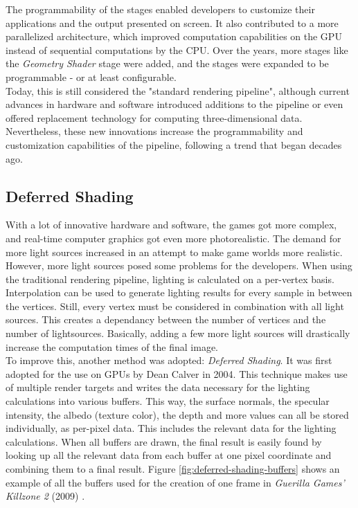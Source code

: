 \noindent
The programmability of the stages enabled developers to customize their applications and the output presented 
on screen. It also contributed to a more parallelized architecture, which improved computation capabilities on 
the \ac{GPU} instead of sequential computations by the \ac{CPU}. Over the years, more stages like the 
\emph{Geometry Shader} stage were added, and the stages were expanded to be programmable - or at least configurable. \\

\noindent
Today, this is still considered the "standard rendering pipeline", although current advances in hardware and software 
introduced additions to the pipeline or even offered replacement technology for computing three-dimensional data.
Nevertheless, these new innovations increase the programmability and customization capabilities of the pipeline,   
following a trend that began decades ago.


\subsection*{Deferred Shading} \label{subsec-deferred-rendering}

With a lot of innovative hardware and software, the games got more complex, and real-time computer graphics got even 
more photorealistic. The demand for more light sources increased in an attempt to make game worlds more realistic. 
However, more light sources posed some problems for the developers. When using the traditional rendering pipeline, 
lighting is calculated on a per-vertex basis. Interpolation can be used to generate lighting results for every sample 
in between the vertices. Still, every vertex must be considered in combination with all light sources. This creates a 
dependancy between the number of vertices and the number of lightsources. Basically, adding a few more light sources 
will drastically increase the computation times of the final image. \\

\noindent
To improve this, another method was adopted: \emph{Deferred Shading}. It was first adopted for the use on \ac{GPU}s 
by Dean Calver \cite{Calver2004} in 2004. This technique makes use of multiple render targets and writes the data 
necessary for the lighting calculations into various buffers. This way, the surface normals, the specular intensity, 
the albedo (texture color), the depth and more values can all be stored individually, as per-pixel data. This includes 
the relevant data for the lighting calculations. When all buffers are drawn, the final result is easily found by 
looking up all the relevant data from each buffer at one pixel coordinate and combining them to a final result. 
Figure \ref{fig:deferred-shading-buffers} shows an example of all the buffers used for the creation of one frame in 
\emph{Guerilla Games'} \emph{Killzone 2} (2009) \cite{KillzoneFandom}. 

